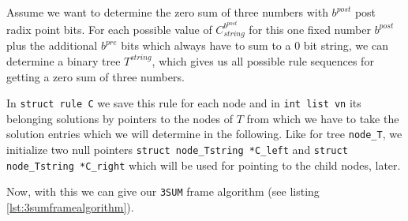 Assume we want to determine the zero sum of three numbers with $b^{post}$ post radix point bits. For each possible value of $C^{b^{post}}_{string}$ for this one fixed number $b^{post}$ plus the additional $b^{pre}$ bits which always have to sum to a $0$ bit string, we can determine a binary tree $T^{string}$, which gives us all possible rule sequences for getting a zero sum of three numbers.

In \texttt{struct rule C} we save this rule for each node and in \texttt{int list vn} its belonging solutions by pointers to the nodes of $T$ from which we have to take the solution entries which we will determine in the following. Like for tree \texttt{node\_T}, we initialize two null pointers \texttt{struct node\_Tstring *C\_left} and \texttt{struct node\_Tstring *C\_right} which will be used for pointing to the child nodes, later.

Now, with this we can give our \texttt{3SUM} frame algorithm (see listing \ref{lst:3sumframealgorithm}).

